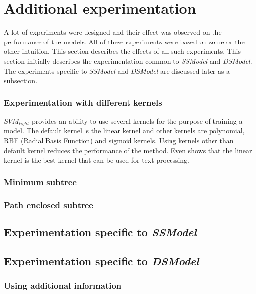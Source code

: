 \section{Additional experimentation}\label{sec:experiments}

A lot of experiments were designed and their effect was observed on the performance of the models. All of these experiments were based on some or the other intuition. This section describes the effects of all such experiments. This section initially describes the experimentation common to \textit{SSModel} and \textit{DSModel}. The experiments specific to \textit{SSModel} and \textit{DSModel} are discussed later as a subsection.

\subsubsection*{Experimentation with different kernels}

$SVM_{light}$ provides an ability to use several kernels for the purpose of training a model. The default kernel is the linear kernel and other kernels are polynomial, RBF (Radial Basis Function) and sigmoid kernels. Using kernels other than default kernel reduces the performance of the method. Even \cite{joachims1998text} shows that the linear kernel is the best kernel that can be used for text processing.

\subsubsection*{Minimum subtree}
\subsubsection*{Path enclosed subtree}

\subsection{Experimentation specific to \textit{SSModel}}

\subsection{Experimentation specific to \textit{DSModel}}

\subsubsection*{Using additional information}

